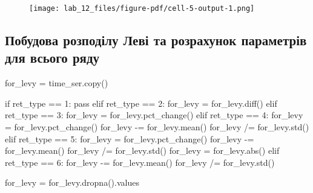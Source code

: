 \documentclass[
  letterpaper,
]{report}
\newenvironment{Shaded}{\begin{snugshade}}{\end{snugshade}}
\newcommand{\BuiltInTok}[1]{\textcolor[rgb]{0.00,0.23,0.31}{#1}}
\newcommand{\ControlFlowTok}[1]{\textcolor[rgb]{0.00,0.23,0.31}{#1}}
\newcommand{\DecValTok}[1]{\textcolor[rgb]{0.68,0.00,0.00}{#1}}
\newcommand{\NormalTok}[1]{\textcolor[rgb]{0.00,0.23,0.31}{#1}}
\newcommand{\OperatorTok}[1]{\textcolor[rgb]{0.37,0.37,0.37}{#1}}
\begin{document}
\begin{figure}[H]

{\centering \texttt{[image: lab\_12\_files/figure-pdf/cell-5-output-1.png]}

}

\end{figure}

\hypertarget{ux43fux43eux431ux443ux434ux43eux432ux430-ux440ux43eux437ux43fux43eux434ux456ux43bux443-ux43bux435ux432ux456-ux442ux430-ux440ux43eux437ux440ux430ux445ux443ux43dux43eux43a-ux43fux430ux440ux430ux43cux435ux442ux440ux456ux432-ux434ux43bux44f-ux432ux441ux44cux43eux433ux43e-ux440ux44fux434ux443}{%
\subsection{Побудова розподілу Леві та розрахунок параметрів для всього
ряду}\label{ux43fux43eux431ux443ux434ux43eux432ux430-ux440ux43eux437ux43fux43eux434ux456ux43bux443-ux43bux435ux432ux456-ux442ux430-ux440ux43eux437ux440ux430ux445ux443ux43dux43eux43a-ux43fux430ux440ux430ux43cux435ux442ux440ux456ux432-ux434ux43bux44f-ux432ux441ux44cux43eux433ux43e-ux440ux44fux434ux443}}

\begin{Shaded}
\begin{Highlighting}[]
\NormalTok{for\_levy }\OperatorTok{=}\NormalTok{ time\_ser.copy()}

\ControlFlowTok{if}\NormalTok{ ret\_type }\OperatorTok{==} \DecValTok{1}\NormalTok{:}
    \ControlFlowTok{pass}
\ControlFlowTok{elif}\NormalTok{ ret\_type }\OperatorTok{==} \DecValTok{2}\NormalTok{:}
\NormalTok{    for\_levy }\OperatorTok{=}\NormalTok{ for\_levy.diff()}
\ControlFlowTok{elif}\NormalTok{ ret\_type }\OperatorTok{==} \DecValTok{3}\NormalTok{:}
\NormalTok{    for\_levy }\OperatorTok{=}\NormalTok{ for\_levy.pct\_change()}
\ControlFlowTok{elif}\NormalTok{ ret\_type }\OperatorTok{==} \DecValTok{4}\NormalTok{:}
\NormalTok{    for\_levy }\OperatorTok{=}\NormalTok{ for\_levy.pct\_change()}
\NormalTok{    for\_levy }\OperatorTok{{-}=}\NormalTok{ for\_levy.mean()}
\NormalTok{    for\_levy }\OperatorTok{/=}\NormalTok{ for\_levy.std()}
\ControlFlowTok{elif}\NormalTok{ ret\_type }\OperatorTok{==} \DecValTok{5}\NormalTok{: }
\NormalTok{    for\_levy }\OperatorTok{=}\NormalTok{ for\_levy.pct\_change()}
\NormalTok{    for\_levy }\OperatorTok{{-}=}\NormalTok{ for\_levy.mean()}
\NormalTok{    for\_levy }\OperatorTok{/=}\NormalTok{ for\_levy.std()}
\NormalTok{    for\_levy }\OperatorTok{=}\NormalTok{ for\_levy.}\BuiltInTok{abs}\NormalTok{()}
\ControlFlowTok{elif}\NormalTok{ ret\_type }\OperatorTok{==} \DecValTok{6}\NormalTok{:}
\NormalTok{    for\_levy }\OperatorTok{{-}=}\NormalTok{ for\_levy.mean()}
\NormalTok{    for\_levy }\OperatorTok{/=}\NormalTok{ for\_levy.std()}

\NormalTok{for\_levy }\OperatorTok{=}\NormalTok{ for\_levy.dropna().values}
\end{Highlighting}
\end{Shaded}
\end{document}
